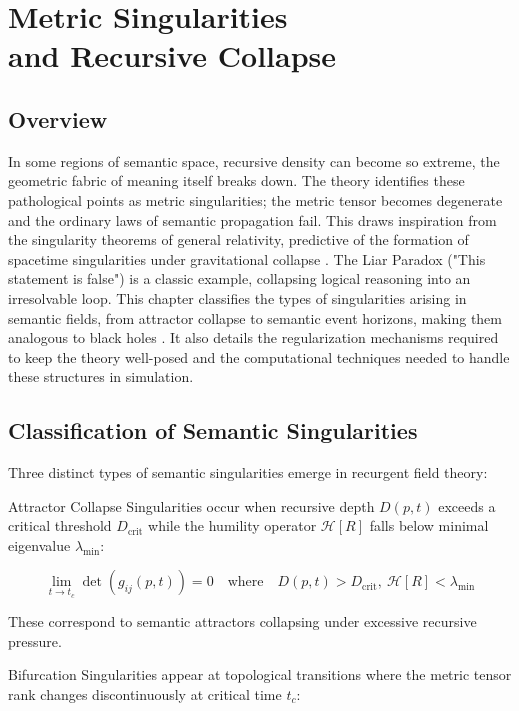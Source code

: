 \chapter{Metric Singularities \\ and Recursive Collapse}

\section{Overview}

In some regions of semantic space, recursive density can become so extreme, the geometric fabric of meaning itself breaks down. The theory identifies these pathological points as metric singularities; the metric tensor becomes degenerate and the ordinary laws of semantic propagation fail. This draws inspiration from the singularity theorems of general relativity, predictive of the formation of spacetime singularities under gravitational collapse \autocite{Penrose1965}. The Liar Paradox ("This statement is false") is a classic example, collapsing logical reasoning into an irresolvable loop. This chapter classifies the types of singularities arising in semantic fields, from attractor collapse to semantic event horizons, making them analogous to black holes \autocite{Hawking1974}. It also details the regularization mechanisms required to keep the theory well-posed and the computational techniques needed to handle these structures in simulation.

\section{Classification of Semantic Singularities}

Three distinct types of semantic singularities emerge in recurgent field theory:

Attractor Collapse Singularities occur when recursive depth \(D(p, t)\) exceeds a critical threshold \(D_{\text{crit}}\) while the humility operator \(\mathcal{H}[R]\) falls below minimal eigenvalue \(\lambda_{\text{min}}\):

\begin{equation}
\lim_{t \to t_c} \det(g_{ij}(p, t)) = 0 \quad \text{where} \quad D(p, t) > D_{\text{crit}},\ \mathcal{H}[R] < \lambda_{\text{min}}
\end{equation}

These correspond to semantic attractors collapsing under excessive recursive pressure.

Bifurcation Singularities appear at topological transitions where the metric tensor rank changes discontinuously at critical time \(t_c\):

